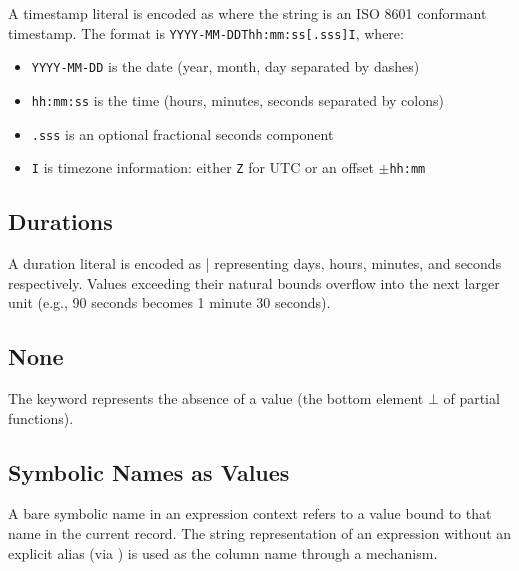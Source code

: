 A timestamp literal is encoded as \term{)} where the string is an ISO 8601 conformant timestamp. The format is \texttt{YYYY-MM-DDThh:mm:ss[.sss]I}, where:
\begin{itemize}
    \item \texttt{YYYY-MM-DD} is the date (year, month, day separated by dashes)
    \item \texttt{hh:mm:ss} is the time (hours, minutes, seconds separated by colons)
    \item \texttt{.sss} is an optional fractional seconds component
    \item \texttt{I} is timezone information: either \texttt{Z} for UTC or an offset $\pm$\texttt{hh:mm}
\end{itemize}

\subsection{Durations}

A duration literal is encoded as \term{,} \term{,} \term{,}  | \term{)} representing days, hours, minutes, and seconds respectively. Values exceeding their natural bounds overflow into the next larger unit (e.g., 90 seconds becomes 1 minute 30 seconds).

\subsection{None}

The keyword  represents the absence of a value (the bottom element $\bot$ of partial functions).

\subsection{Symbolic Names as Values}

A bare symbolic name in an expression context refers to a value bound to that name in the current record. The string representation of an expression without an explicit alias (via ) is used as the column name through a  mechanism.
